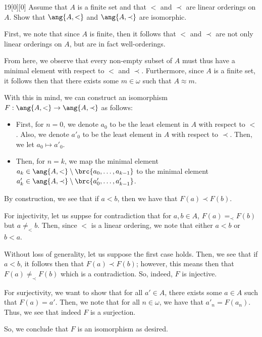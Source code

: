 \documentclass{article}
\begin{document}
\begin{hw}{19}[0][0]
	Assume that $A$ is a finite set and that $<$ and $\prec$ are linear orderings on $A$. Show that $\ang{A, <}$ and $\ang{A, \prec}$ are isomorphic.
\end{hw}
\begin{solution}
	First, we note that since $A$ is finite, then it follows that $<$ and $\prec$ are not only linear orderings on $A$, but are in fact well-orderings.
	
	From here, we observe that every non-empty subset of $A$ must thus have a minimal element with respect to $<$ and $\prec$. Furthermore, since $A$ is a finite set, it follows then that there exists some $m \in \omega$ such that $A \approx m$.
	
	With this in mind, we can construct an isomorphism $F: \ang{A, <} \rightarrow \ang{A, \prec}$ as follows:
	\begin{itemize}
		\item First, for $n = 0$, we denote $a_0$ to be the least element in $A$ with respect to $<$. Also, we denote $a'_0$ to be the least element in $A$ with respect to $\prec$. Then, we let $a_0 \mapsto a'_0$.
		\item Then, for $n = k$, we map the minimal element $a_k \in \ang{A, <} \setminus \brc{a_0, \ldots, a_{k-1}}$ to the minimal element $a'_k \in \ang{A, \prec} \setminus \brc{a'_0, \ldots, a'_{k-1}}$.
	\end{itemize}

	By construction, we see that if $a < b$, then we have that $F(a) \prec F(b)$.

	For injectivity, let us suppse for contradiction that for $a, b \in A$, $F(a) =_\prec F(b)$ but $a \neq_< b$. Then, since $<$ is a linear ordering, we note that either $a < b$ or $b < a$.
	
	Without loss of generality, let us suppose the first case holds. Then, we see that if $a < b$, it follows then that $F(a) \prec F(b)$; however, this means then that $F(a) \neq_\prec F(b)$ which is a contradiction. So, indeed, $F$ is injective.
	
	For surjectivity, we want to show that for all $a' \in A$, there exists some $a \in A$ such that $F(a) = a'$. Then, we note that for all $n \in \omega$, we have that $a'_n = F(a_n)$. Thus, we see that indeed $F$ is a surjection.
	
	So, we conclude that $F$ is an isomorphism as desired.
\end{solution}
\end{document}
